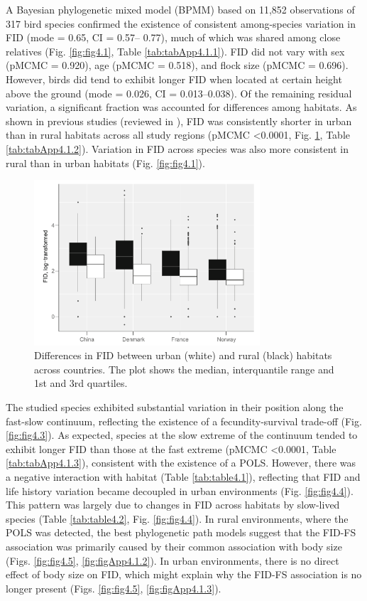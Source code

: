 A Bayesian phylogenetic mixed model (BPMM) based on 11,852
observations of 317 bird species confirmed the existence of consistent
among-species variation in FID (mode = 0.65, CI = 0.57–
0.77), much of which was shared among close relatives (Fig. \ref{fig:fig4.1},
Table \ref{tab:tabApp4.1.1}). FID did not vary with sex (pMCMC = 0.920), age
(pMCMC = 0.518), and flock size (pMCMC = 0.696). However,
birds did tend to exhibit longer FID when located at certain height
above the ground (mode = 0.026, CI = 0.013–0.038). Of the remaining
residual variation, a significant fraction was accounted for
differences among habitats. As shown in previous studies
(reviewed in \citet{Moller2014a}), FID was consistently shorter in urban
than in rural habitats across all study regions (pMCMC \textless{0.0001},
Fig. \ref{fig:fig4.2}, Table \ref{tab:tabApp4.1.2}). Variation in FID across species was also more
consistent in rural than in urban habitats (Fig. \ref{fig:fig4.1}).

\begin{figure}
\centering
\includegraphics[width=0.75\textwidth]{./Figures/chapter04/Fig_2.png}
\caption[FID across countries]{Differences in FID between urban (white) and rural
(black) habitats across countries. The plot shows the median,
interquantile range and 1st and 3rd quartiles.}\label{fig:fig4.2}
\end{figure}

The studied species exhibited substantial variation in their
position along the fast-slow continuum, reflecting the existence
of a fecundity-survival trade-off (Fig. \ref{fig:fig4.3}). As expected, species at
the slow extreme of the continuum tended to exhibit longer FID
than those at the fast extreme (pMCMC \textless{0.0001}, Table \ref{tab:tabApp4.1.3}),
consistent with the existence of a POLS. However, there was a
negative interaction with habitat (Table \ref{tab:table4.1}), reflecting that FID
and life history variation became decoupled in urban environments
(Fig. \ref{fig:fig4.4}). This pattern was largely due to changes in FID
across habitats by slow-lived species (Table \ref{tab:table4.2}, Fig. \ref{fig:fig4.4}). In rural
environments, where the POLS was detected, the best phylogenetic
path models suggest that the FID-FS association was primarily
caused by their common association with body size
(Figs. \ref{fig:fig4.5}, \ref{fig:figApp4.1.2}). In urban environments, there is no direct effect of
body size on FID, which might explain why the FID-FS association 
is no longer present (Figs. \ref{fig:fig4.5}, \ref{fig:figApp4.1.3}).

